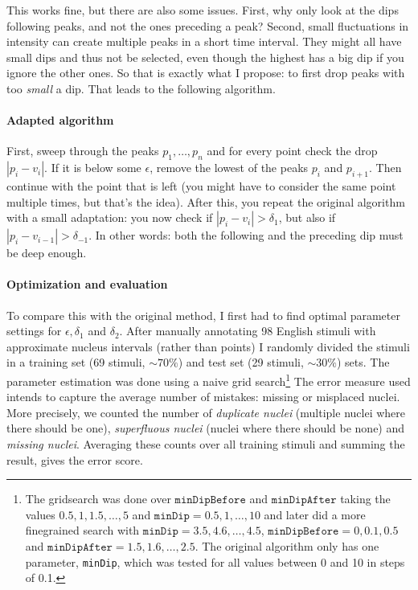 \documentclass[a4paper,9pt]{article}
\begin{document}
This works fine, but there are also some issues. First, why only look at the dips following peaks, and not the ones preceding a peak? Second, small fluctuations in intensity can create multiple peaks in a short time interval. They might all have small dips and thus not be selected, even though the highest has a big dip if you ignore the other ones. So that is exactly what I propose: to first drop peaks with too \emph{small} a dip. That leads to the following algorithm. 

\paragraph{Adapted algorithm}
First, sweep through the peaks $p_1, \dots, p_n$ and for every point check the drop $|p_i - v_i|$. If it is below some $\epsilon$, remove the lowest of the peaks $p_i$ and $p_{i+1}$. Then continue with the point that is left (you might have to consider the same point multiple times, but that's the idea). After this, you repeat the original algorithm with a small adaptation: you now check if $|p_i - v_i| > \delta_1$, but also if $|p_i- v_{i-1}| > \delta_{-1}$. In other words: both the following and the preceding dip must be deep enough.

\paragraph{Optimization and evaluation}
To compare this with the original method, I first had to find optimal parameter settings for $\epsilon, \delta_1$ and $\delta_2$. After manually annotating 98 English stimuli with approximate nucleus intervals (rather than points) I randomly divided the stimuli in a training set (69 stimuli, $\sim 70\%$) and test set (29 stimuli, $\sim 30\%$) sets. The parameter estimation was done using a naive grid search\footnote{The gridsearch was done over $\texttt{minDipBefore}$ and $ \texttt{minDipAfter}$ taking the values $0.5, 1, 1.5, \dots, 5$ and $\texttt{minDip} = 0.5, 1, \dots, 10$ and later did a more finegrained search with $\texttt{minDip} = 3.5,4.6,\dots, 4.5$,  $\texttt{minDipBefore} = 0, 0.1, 0.5$ and $\texttt{minDipAfter}=1.5, 1.6, \dots, 2.5$. The original algorithm only has one parameter, \texttt{minDip}, which was tested for all values between 0 and 10 in steps of 0.1.}
	The error measure used intends to capture the average number of mistakes: missing or misplaced nuclei. More precisely, we counted the number of \emph{duplicate nuclei} (multiple nuclei where there should be one), \emph{superfluous nuclei} (nuclei where there should be none) and \emph{missing nuclei}. Averaging these counts over all training stimuli and summing the result, gives the error score.
\end{document}
